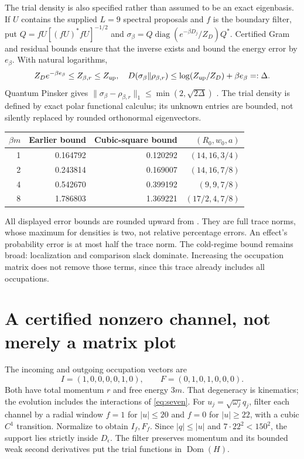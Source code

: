 \documentclass[11pt]{article}
\newcommand{\Dom}{\operatorname{Dom}}
\begin{document}
The trial density is also specified rather than assumed to be an exact
eigenbasis. If $U$ contains the supplied $L=9$ spectral proposals and $f$
is the boundary filter, put
$Q=fU[(fU)^*fU]^{-1/2}$ and
$\sigma_\beta=Q\operatorname{diag}(e^{-\beta D_j}/Z_D)Q^*$.
Certified Gram and residual bounds ensure that the inverse exists and
bound the energy error by $e_\beta$. With natural logarithms,
\[
 Z_D e^{-\beta e_\beta}\le Z_{\beta,r}\le Z_{\rm up},\quad
 D(\sigma_\beta\|\rho_{\beta,r})\le
 \log(Z_{\rm up}/Z_D)+\beta e_\beta=:\Delta .
\]
Quantum Pinsker gives $\|\sigma_\beta-\rho_{\beta,r}\|_1
\le\min(2,\sqrt{2\Delta})$ \cite{Watrous}. The trial density is defined by
exact polar functional calculus; its unknown entries are bounded, not
silently replaced by rounded orthonormal eigenvectors.

\begin{center}
\begin{tabular}{@{}rrrr@{}}
\toprule
$\beta m$ & Earlier bound & Cubic-square bound & $(R_0,w_0,a)$\\
\midrule
1 & 0.164792 & 0.120292 & $(14,16,3/4)$\\
2 & 0.243814 & 0.169007 & $(14,16,7/8)$\\
4 & 0.542670 & 0.399192 & $(9,9,7/8)$\\
8 & 1.786803 & 1.369221 & $(17/2,4,7/8)$\\
\bottomrule
\end{tabular}
\end{center}
All displayed error bounds are rounded upward from \cite{CH}. They are
full trace norms, whose maximum for densities is two, not relative
percentage errors. An effect's probability error is at most half the
trace norm. The cold-regime bound remains broad: localization and
comparison slack dominate. Increasing the occupation matrix does not
remove those terms, since this trace already includes all occupations.

\section{A certified nonzero channel, not merely a matrix plot}
The incoming and outgoing occupation vectors are
\[
 I=(1,0,0,0,0,1,0),\qquad F=(0,1,0,1,0,0,0).
\]
Both have total momentum $r$ and free energy $3m$. That degeneracy is
kinematics; the evolution includes the interactions of \eqref{eq:seven}.
For $u_j=\sqrt{\omega_j}q_j$, filter each channel by a radial window
$f=1$ for $|u|\le20$ and $f=0$ for $|u|\ge22$, with a cubic $C^1$
transition. Normalize to obtain $I_f,F_f$. Since $|q|\le|u|$ and
$7\cdot22^2<150^2$, the support lies strictly inside $D_\epsilon$.
The filter preserves momentum and its bounded weak second derivatives
put the trial functions in $\Dom(H)$.
\end{document}
